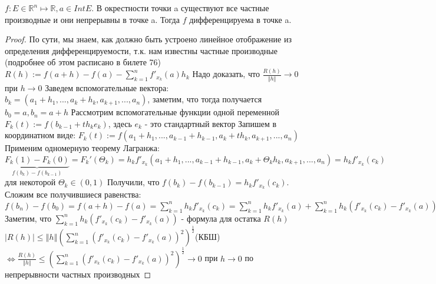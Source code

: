 
\begin{theorem} \thmslashn

    $f : E \in \mathbb{R}^n \mapsto \mathbb{R}, a \in Int E$.\newline
    В окрестности точки a существуют все частные производные и они непрерывны в точке a.\newline
    Тогда $f$ дифференцируема в точке a.\newline

    \begin{proof} \thmslashn

	По сути, мы знаем, как должно быть устроено линейное отображение из определения дифференцируемости, т.к. нам известны частные производные (подробнее об этом расписано в билете 76)\newline
	$R(h) := f(a + h) - f(a) - \sum_{k = 1}^n f'_{x_k}(a)h_k$\newline
	Надо доказать, что $\frac{R(h)}{\left\Vert h \right\Vert} \rightarrow 0$ при $h \rightarrow 0$\newline
	Заведем вспомогательные вектора: $b_k = (a_1 + h_1, ..., a_k + h_k, a_{k + 1}, ..., a_n)$, заметим, что тогда получается $b_0 = a, b_n = a + h$\newline
	Рассмотрим вспомогательные функции одной переменной $F_k(t) := f(b_{k - 1} + th_ke_k)$, здесь $e_k$ - это стандартный вектор\newline 
	Запишем в координатном виде: $F_k(t) := f(a_1 + h_1, ..., a_{k - 1} + h_{k - 1}, a_k + th_k, a_{k + 1}, ..., a_n)$\newline 
	Применим одномерную теорему Лагранжа: $\underbrace{F_k(1) - F_k(0)}_{f(b_k) - f(b_{k - 1})} = F_k'(\Theta_k) = h_kf'_{x_k}(a_1 + h_1, ..., a_{k - 1} + h_{k - 1}, a_k + \Theta_kh_k, a_{k + 1},...,a_n) = h_kf'_{x_k}(c_k)$ для некоторой $\Theta_k \in (0, 1)$\newline
	Получили, что $f(b_k) - f(b_{k - 1}) = h_kf'_{x_k}(c_k)$. Сложим все получившиеся равенства: $f(b_n) - f(b_0) = f(a + h) - f(a) = \sum_{k = 1}^n h_kf'_{x_k}(c_k) = \sum_{k = 1}^n h_kf'_{x_k}(a) + \sum_{k = 1}^n h_k(f'_{x_k}(c_k) - f'_{x_k}(a))$\newline
	Заметим, что $\sum_{k = 1}^n h_k(f'_{x_k}(c_k) - f'_{x_k}(a))$ - формула для остатка $R(h)$\newline
	$\left\vert R(h)\right\vert \leqslant \left\Vert h \right\Vert (\sum_{k = 1}^n(f'_{x_k}(c_k) - f'_{x_k}(a))^2)^{\frac{1}{2}}$(КБШ)\newline
	$\Leftrightarrow \frac{R(h)}{\left\Vert h \right\Vert} \leqslant (\sum_{k = 1}^n(f'_{x_k}(c_k) - f'_{x_k}(a))^2)^{\frac{1}{2}} \rightarrow 0$ при $h \rightarrow 0$ по непрерывности частных производных


\end{proof}
\end{theorem}
